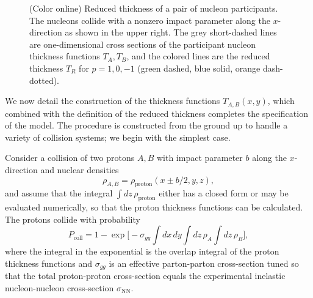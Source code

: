 \documentclass[aps,prc,reprint,amsmath,noeprint]{revtex4-1}
\begin{document}
\begin{figure}[t]
  \caption{
    \label{fig:TR}
    (Color online)
    Reduced thickness of a pair of nucleon participants.
    The nucleons collide with a nonzero impact parameter along the $x$-direction as shown in the upper right.
    The grey short-dashed lines are one-dimensional cross sections of the participant nucleon thickness functions $T_A, T_B$, and the colored lines are the reduced thickness $T_R$ for $p = 1, 0, -1$ (green dashed, blue solid, orange dash-dotted).
  }
\end{figure}

We now detail the construction of the thickness functions $T_{A,B}(x, y)$, which combined with the definition
of the reduced thickness completes the specification of the model.  The procedure is constructed from the
ground up to handle a variety of collision systems; we begin with the simplest case.

Consider a collision of two protons $A, B$ with impact parameter $b$ along the $x$-direction and nuclear densities
\begin{equation}
  \rho_{A,B} = \rho_\text{proton}(x \pm b/2, y, z),
\end{equation}
and assume that the integral $\int dz \, \rho_\text{proton}$ either has a closed form or may be evaluated numerically, so that the proton thickness functions can be calculated.
The protons collide with probability \cite{dEnterria:2010hd}
\begin{equation}
  P_\text{coll} = 1 - \exp\biggl[ -\sigma_{gg} \int dx \, dy \int dz \, \rho_A \int dz \, \rho_B \biggr],
  \label{eq:pcoll}
\end{equation}
where the integral in the exponential is the overlap integral of the proton thickness functions and
$\sigma_{gg}$ is an effective parton-parton cross-section tuned so that the total proton-proton
cross-section equals the experimental inelastic nucleon-nucleon cross-section $\sigma_\text{NN}$.
\end{document}
